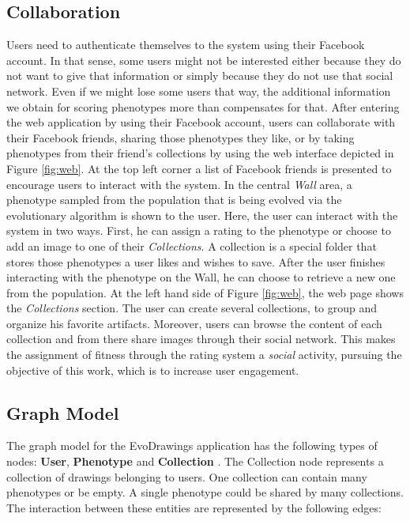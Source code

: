 \subsection{Collaboration}
\label{sec:col}
Users need to authenticate themselves to the system using their
Facebook account. In that sense, some users might not be interested
either because they do not want to give that information or simply because
they do not use that social network. Even if we might lose
some users that way, the additional information we obtain for scoring
phenotypes more than compensates for that. 
After entering the web application by using their Facebook account,
users can collaborate with their Facebook friends, 
sharing those phenotypes they like, or by taking phenotypes
from their friend's collections by using the web interface depicted 
in Figure \ref{fig:web}.
At the top left corner a list of Facebook friends is presented
to encourage users to interact with the system. In the central 
\emph{ Wall } area, a phenotype sampled from the population that is
being evolved via the evolutionary algorithm 
is shown to the user.
Here, the user can interact with the system in two ways.
First, he can assign a rating to the phenotype or choose to add an image to one of their \emph{Collections}.
A collection is a special folder that stores those phenotypes a user likes and wishes
to save. After the user finishes interacting with the phenotype
on the Wall, he can choose to retrieve a new one from the population.
At the left hand side of Figure \ref{fig:web}, the web page shows the \emph{Collections} section.
The user can create several collections, to group and organize his favorite 
artifacts. Moreover, users can browse the content of each collection and from
there share images through their social network. This makes the assignment 
of fitness through the rating system a {\em social} activity, 
pursuing the objective of this work, which is to increase user engagement.

\subsection{Graph Model} 
The graph model for the EvoDrawings application has the following types of
nodes: {\bf User}, {\bf Phenotype} and {\bf Collection} . The Collection node represents
a collection of drawings belonging to users. One collection can contain many phenotypes 
or be empty. A single phenotype could be shared by many collections. The interaction 
between these entities are represented by the following edges:

